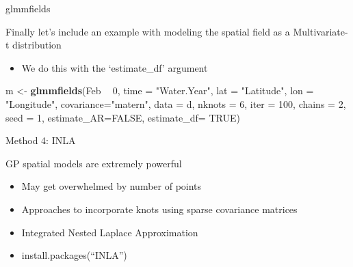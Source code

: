 \documentclass[ignorenonframetext,]{beamer}
\newenvironment{Shaded}{\begin{snugshade}}{\end{snugshade}}
\newcommand{\DataTypeTok}[1]{\textcolor[rgb]{0.13,0.29,0.53}{#1}}
\newcommand{\DecValTok}[1]{\textcolor[rgb]{0.00,0.00,0.81}{#1}}
\newcommand{\KeywordTok}[1]{\textcolor[rgb]{0.13,0.29,0.53}{\textbf{#1}}}
\newcommand{\NormalTok}[1]{#1}
\newcommand{\OperatorTok}[1]{\textcolor[rgb]{0.81,0.36,0.00}{\textbf{#1}}}
\newcommand{\OtherTok}[1]{\textcolor[rgb]{0.56,0.35,0.01}{#1}}
\newcommand{\StringTok}[1]{\textcolor[rgb]{0.31,0.60,0.02}{#1}}
\providecommand{\tightlist}{%
  \setlength{\itemsep}{0pt}\setlength{\parskip}{0pt}}
\begin{document}
\begin{frame}[fragile]{glmmfields}
\protect\hypertarget{glmmfields-2}{}

Finally let's include an example with modeling the spatial field as a
Multivariate-t distribution

\begin{itemize}
\tightlist
\item
  We do this with the `estimate\_df' argument
\end{itemize}

\begin{Shaded}
\begin{Highlighting}[]
\NormalTok{m <-}\StringTok{ }\KeywordTok{glmmfields}\NormalTok{(Feb }\OperatorTok{~}\StringTok{ }\DecValTok{0}\NormalTok{, }\DataTypeTok{time =} \StringTok{"Water.Year"}\NormalTok{,}
 \DataTypeTok{lat =} \StringTok{"Latitude"}\NormalTok{, }\DataTypeTok{lon =} \StringTok{"Longitude"}\NormalTok{, }\DataTypeTok{covariance=}\StringTok{"matern"}\NormalTok{,}
  \DataTypeTok{data =}\NormalTok{ d, }\DataTypeTok{nknots =} \DecValTok{6}\NormalTok{, }\DataTypeTok{iter =} \DecValTok{100}\NormalTok{, }\DataTypeTok{chains =} \DecValTok{2}\NormalTok{, }\DataTypeTok{seed =} \DecValTok{1}\NormalTok{,}
  \DataTypeTok{estimate_AR=}\OtherTok{FALSE}\NormalTok{, }\DataTypeTok{estimate_df=} \OtherTok{TRUE}\NormalTok{)}
\end{Highlighting}
\end{Shaded}

\end{frame}

\begin{frame}{Method 4: INLA}
\protect\hypertarget{method-4-inla}{}

GP spatial models are extremely powerful

\begin{itemize}
\item
  May get overwhelmed by number of points
\item
  Approaches to incorporate knots using sparse covariance matrices
\item
  Integrated Nested Laplace Approximation
\item
  install.packages(``INLA'')
\end{itemize}

\end{frame}
\end{document}
